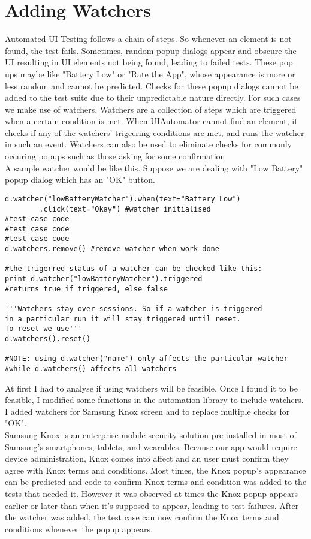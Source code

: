 \section{Adding Watchers}
Automated UI Testing follows a chain of steps. So whenever an element is not found, the test fails. Sometimes, random popup dialogs appear and obscure the UI resulting in UI elements not being found, leading to failed tests. These pop ups maybe like "Battery Low" or "Rate the App", whose appearance is more or less random and cannot be predicted. Checks for these popup dialogs cannot be added to the test suite due to their unpredictable nature directly. For such cases we make use of watchers. Watchers are a collection of steps which are triggered when a certain condition is met. When UIAutomator cannot find an element, it checks if any of the watchers' trigeering conditions are met, and runs the watcher in such an event. Watchers can also be used to eliminate checks for commonly occuring popups such as those asking for some confirmation\\

A sample watcher would be like this. Suppose we are dealing with "Low Battery" popup dialog which has an "OK" button.

\begin{lstlisting}[style=PyStyle]
d.watcher("lowBatteryWatcher").when(text="Battery Low")
		.click(text="Okay") #watcher initialised
#test case code
#test case code
#test case code
d.watchers.remove() #remove watcher when work done

#the trigerred status of a watcher can be checked like this:
print d.watcher("lowBatteryWatcher").triggered 
#returns true if triggered, else false

'''Watchers stay over sessions. So if a watcher is triggered 
in a particular run it will stay triggered until reset. 
To reset we use'''
d.watchers().reset()

#NOTE: using d.watcher("name") only affects the particular watcher 
#while d.watchers() affects all watchers
\end{lstlisting}

At first I had to analyse if using watchers will be feasible. Once I found it to be feasible, I modified some functions in the automation library to include watchers. I added watchers for Samsung Knox screen and to replace multiple checks for "OK".\\ 

Samsung Knox is an enterprise mobile security solution pre-installed in most of Samsung's smartphones, tablets, and wearables. Because our app would require device administration, Knox comes into affect and an user must confirm they agree with Knox terms and conditions. Most times, the Knox popup's appearance can be predicted and code to confirm Knox terms and condition was added to the tests that needed it. However it was observed at times the Knox popup appears earlier or later than when it's supposed to appear, leading to test failures. After the watcher was added, the test case can now confirm the Knox terms and conditions whenever the popup appears.\\

